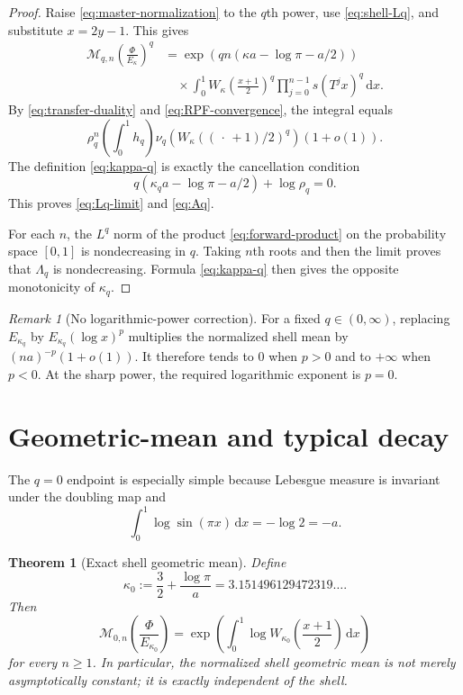 \documentclass[11pt,oneside]{article}
\newtheorem{theorem}{Theorem}[section]
\theoremstyle{definition}
\theoremstyle{remark}
\newtheorem{remark}[remark]{Remark}
\newcommand{\dd}{\,\mathrm d}
\newcommand{\Phiup}{\Phi}
\begin{document}
\begin{proof}
Raise \eqref{eq:master-normalization} to the $q$th power, use
\eqref{eq:shell-Lq}, and substitute $x=2y-1$.  This gives
\begin{align*}
 \mathcal M_{q,n}\!\left(\frac{\Phiup}{E_\kappa}\right)^q
 &=\exp\!\left(qn(\kappa a-\log\pi-a/2)\right)\\
 &\quad\times\int_0^1
 W_\kappa\!\left(\frac{x+1}{2}\right)^q
 \prod_{j=0}^{n-1}s(T^jx)^q\dd x.
\end{align*}
By \eqref{eq:transfer-duality} and \eqref{eq:RPF-convergence}, the integral equals
\[
 \rho_q^n\left(\int_0^1h_q\right)
 \nu_q\!\left(W_\kappa((\,\cdot\,+1)/2)^q\right)(1+o(1)).
\]
The definition \eqref{eq:kappa-q} is exactly the cancellation condition
\[
 q(\kappa_q a-\log\pi-a/2)+\log\rho_q=0.
\]
This proves \eqref{eq:Lq-limit} and \eqref{eq:Aq}.

For each $n$, the $L^q$ norm of the product \eqref{eq:forward-product} on the probability
space $[0,1]$ is nondecreasing in $q$.  Taking $n$th roots and then the limit proves that
$\Lambda_q$ is nondecreasing.  Formula \eqref{eq:kappa-q} then gives the opposite
monotonicity of $\kappa_q$.
\end{proof}

\begin{remark}[No logarithmic-power correction]
\label{rem:no-log-correction}
For a fixed $q\in(0,\infty)$, replacing $E_{\kappa_q}$ by
$E_{\kappa_q}(\log x)^p$ multiplies the normalized shell mean by
$(na)^{-p}(1+o(1))$.  It therefore tends to $0$ when $p>0$ and to $+\infty$ when $p<0$.
At the sharp power, the required logarithmic exponent is $p=0$.
\end{remark}

\section{Geometric-mean and typical decay}
\label{sec:typical}

The $q=0$ endpoint is especially simple because Lebesgue measure is invariant under the
doubling map and
\begin{equation}
 \int_0^1\log\sin(\pi x)\dd x=-\log2=-a.
 \label{eq:log-sine-integral}
\end{equation}

\begin{theorem}[Exact shell geometric mean]
\label{thm:geometric-mean}
Define
\begin{equation}
 \kappa_0:=\frac32+\frac{\log\pi}{a}
 =3.151496129472319\ldots .
 \label{eq:kappa0}
\end{equation}
Then
\begin{equation}
 \mathcal M_{0,n}\!\left(\frac{\Phiup}{E_{\kappa_0}}\right)
 =\exp\!\left(\int_0^1
    \log W_{\kappa_0}\!\left(\frac{x+1}{2}\right)\dd x\right)
 \label{eq:exact-geometric-mean}
\end{equation}
for every $n\ge1$.  In particular, the normalized shell geometric mean is not merely
asymptotically constant; it is exactly independent of the shell.
\end{theorem}
\end{document}
